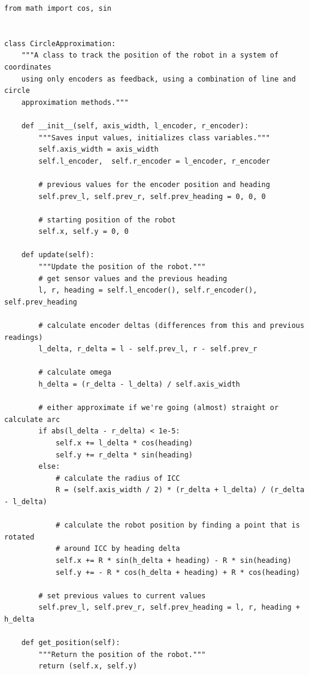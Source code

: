 \documentclass[12pt,twoside]{article}
\begin{document}
\begin{verbatim}
from math import cos, sin


class CircleApproximation:
    """A class to track the position of the robot in a system of coordinates
    using only encoders as feedback, using a combination of line and circle
    approximation methods."""

    def __init__(self, axis_width, l_encoder, r_encoder):
        """Saves input values, initializes class variables."""
        self.axis_width = axis_width
        self.l_encoder,  self.r_encoder = l_encoder, r_encoder

        # previous values for the encoder position and heading
        self.prev_l, self.prev_r, self.prev_heading = 0, 0, 0

        # starting position of the robot
        self.x, self.y = 0, 0

    def update(self):
        """Update the position of the robot."""
        # get sensor values and the previous heading
        l, r, heading = self.l_encoder(), self.r_encoder(), self.prev_heading

        # calculate encoder deltas (differences from this and previous readings)
        l_delta, r_delta = l - self.prev_l, r - self.prev_r

        # calculate omega
        h_delta = (r_delta - l_delta) / self.axis_width

        # either approximate if we're going (almost) straight or calculate arc
        if abs(l_delta - r_delta) < 1e-5:
            self.x += l_delta * cos(heading)
            self.y += r_delta * sin(heading)
        else:
            # calculate the radius of ICC
            R = (self.axis_width / 2) * (r_delta + l_delta) / (r_delta - l_delta)

            # calculate the robot position by finding a point that is rotated
            # around ICC by heading delta
            self.x += R * sin(h_delta + heading) - R * sin(heading)
            self.y += - R * cos(h_delta + heading) + R * cos(heading)

        # set previous values to current values
        self.prev_l, self.prev_r, self.prev_heading = l, r, heading + h_delta

    def get_position(self):
        """Return the position of the robot."""
        return (self.x, self.y)
\end{verbatim}
\end{document}
